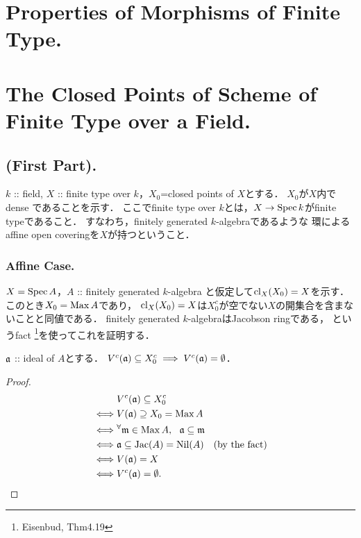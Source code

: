 \documentclass[a4paper]{jsarticle}
\begin{document}
\section{Properties of Morphisms of Finite Type.} %

\section{The Closed Points of Scheme of Finite Type over a Field.} %
    \subsection{(First Part).}
    $k$ :: field,
    $X$ :: finite type over $k$，$X_0$=closed points of $X$とする．
    $X_0$が$X$内でdense であることを示す．
    ここでfinite type over $k$とは，$X \to \operatorname{Spec} k$がfinite typeであること．
    すなわち，finitely generated $k$-algebraであるような
    環によるaffine open coveringを$X$が持つということ．

    \subsubsection{Affine Case.}
    $X=\operatorname{Spec} A$，$A$ :: finitely generated $k$-algebra
    と仮定して$\operatorname{cl}_X(X_0)=X$を示す．
    このとき$X_0=\operatorname{Max} A$であり，
    $\operatorname{cl}_X(X_0)=X$は$X_0^c$が空でない$X$の開集合を含まないことと同値である．
    finitely generated $k$-algebraはJacobson ringである，
    というfact \footnote{Eisenbud, Thm4.19}を使ってこれを証明する．
    \begin{Claim}
        $\mathfrak{a}$ :: ideal of $A$とする．
        $V^c(\mathfrak{a}) \subseteq X_0^c \implies V^c(\mathfrak{a})=\emptyset$．
    \end{Claim}
    \begin{proof}
    \begin{align*}
        {}&     V^c(\mathfrak{a}) \subseteq X_0^c \\
        \iff&   V(\mathfrak{a}) \supseteq X_0=\operatorname{Max} A \\
        \iff&   {}^{\forall} \mathfrak{m} \in \operatorname{Max} A,~~ \mathfrak{a} \subseteq \mathfrak{m} \\
        \iff&   \mathfrak{a} \subseteq \operatorname{Jac}(A)=\operatorname{Nil}(A) ~~~(\text{by the fact}) \\
        \iff&   V(\mathfrak{a})=X \\
        \iff&   V^c(\mathfrak{a})=\emptyset.
    \end{align*}
    \end{proof}
\end{document}

